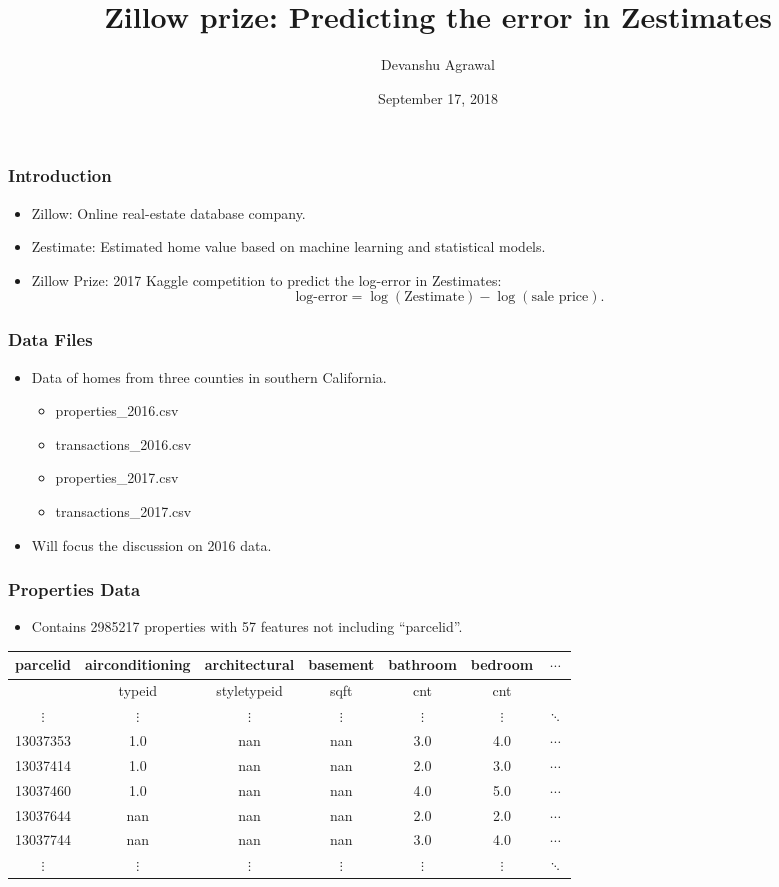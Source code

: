 \documentclass{beamer}
\title{Zillow prize: Predicting the error in Zestimates}
\author{Devanshu Agrawal}
\date{September 17, 2018}
\begin{document}
\begin{frame}
\titlepage
\end{frame}

\begin{frame}
\frametitle{Introduction}
\begin{itemize}
\item Zillow: Online real-estate database company.
\item Zestimate: Estimated home value based on machine learning and statistical models.
\item Zillow Prize: 2017 Kaggle competition to predict the log-error in Zestimates:
\[ \mbox{log-error} = \log(\mbox{Zestimate}) - \log(\mbox{sale price}). \]
\end{itemize}
\end{frame}

\begin{frame}
\frametitle{Data Files}
\begin{itemize}
\item Data of homes from three counties in southern California.
\begin{itemize}
\item properties\_2016.csv
\item transactions\_2016.csv
\item properties\_2017.csv
\item transactions\_2017.csv
\end{itemize}
\item Will focus the discussion on 2016 data.
\end{itemize}
\end{frame}

\begin{frame}
\frametitle{Properties Data}
\begin{itemize}
\item Contains 2985217 properties with 57 features not including ``parcelid''.
\end{itemize}
\begin{center}
\footnotesize
\begin{tabular}{|c|c|c|c|c|c|c|} \hline
parcelid & airconditioning & architectural & basement & bathroom & bedroom & $\cdots$ \\ \hline
\quad & typeid & styletypeid & sqft & cnt & cnt & \quad \\ \hline
$\vdots$ & $\vdots$ & $\vdots$ & $\vdots$ & $\vdots$ & $\vdots$ & $\ddots$ \\
13037353 & 1.0 & nan & nan & 3.0 & 4.0 & $\cdots$ \\
13037414 & 1.0 & nan & nan & 2.0 & 3.0 & $\cdots$ \\
13037460 & 1.0 & nan & nan & 4.0 & 5.0 & $\cdots$ \\
13037644 & nan & nan & nan & 2.0 & 2.0 & $\cdots$ \\
13037744 & nan & nan & nan & 3.0 & 4.0 & $\cdots$ \\
$\vdots$ & $\vdots$ & $\vdots$ & $\vdots$ & $\vdots$ & $\vdots$ & $\ddots$ \\
\hline
\end{tabular}
\end{center}
\end{frame}
\end{document}
